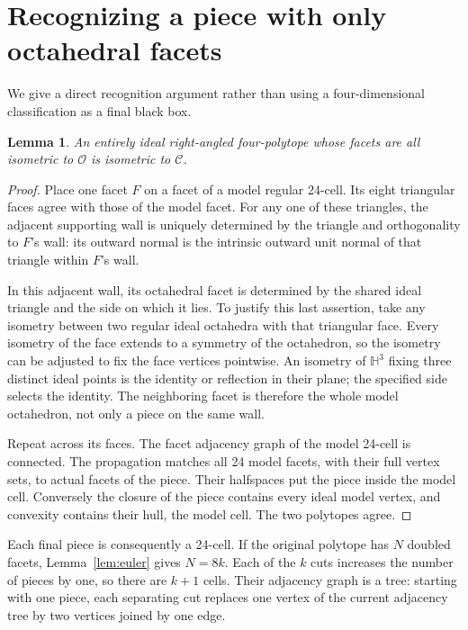 \documentclass[11pt]{article}
\newtheorem{lemma}[theorem]{Lemma}
\theoremstyle{remark}
\newcommand{\HH}{\mathbb H}
\newcommand{\OCT}{\mathcal O}
\newcommand{\CELL}{\mathcal C}
\begin{document}
\section{Recognizing a piece with only octahedral facets}

We give a direct recognition argument rather than using a
four-dimensional classification as a final black box.

\begin{lemma}\label{lem:recognition}
An entirely ideal right-angled four-polytope whose facets are all
isometric to $\OCT$ is isometric to $\CELL$.
\end{lemma}
\begin{proof}
Place one facet $F$ on a facet of a model regular 24-cell. Its
eight triangular faces agree with those of the model facet.
For any one of these triangles, the adjacent supporting wall is
uniquely determined by the triangle and orthogonality to $F$'s
wall: its outward normal is the intrinsic outward unit normal
of that triangle within $F$'s wall.

In this adjacent wall, its octahedral facet is determined by the
shared ideal triangle and the side on which it lies. To justify
this last assertion, take any isometry between two regular ideal
octahedra with that triangular face. Every isometry of the face
extends to a symmetry of the octahedron, so the isometry can be
adjusted to fix the face vertices pointwise. An isometry of
$\HH^3$ fixing three distinct ideal points is the identity or
reflection in their plane; the specified side selects the
identity. The neighboring facet is therefore the whole model
octahedron, not only a piece on the same wall.

Repeat across its faces. The facet adjacency graph of the model
24-cell is connected. The propagation matches all 24 model
facets, with their full vertex sets, to actual facets of the
piece. Their halfspaces put the piece inside the model cell.
Conversely the closure of the piece contains every ideal model
vertex, and convexity contains their hull, the model cell.
The two polytopes agree.
\end{proof}

Each final piece is consequently a 24-cell. If the original
polytope has $N$ doubled facets, Lemma~\ref{lem:euler} gives
$N=8k$. Each of the $k$ cuts increases the number of pieces by
one, so there are $k+1$ cells. Their adjacency graph is a tree:
starting with one piece, each separating cut replaces one vertex
of the current adjacency tree by two vertices joined by one edge.
\end{document}

